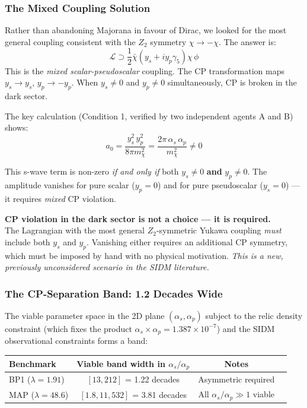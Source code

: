 \documentclass[12pt, a4paper]{article}
\begin{document}
\subsubsection{The Mixed Coupling Solution}

Rather than abandoning Majorana in favour of Dirac, we looked for the most general coupling consistent with the $Z_2$ symmetry $\chi \to -\chi$. The answer is:
\begin{equation}
  \mathcal{L} \supset \frac{1}{2}\bar\chi\left(y_s + iy_p\gamma_5\right)\chi\,\phi
\end{equation}
This is the \emph{mixed scalar-pseudoscalar} coupling. The CP transformation maps $y_s \to y_s$, $y_p \to -y_p$. When $y_s \neq 0$ and $y_p \neq 0$ simultaneously, CP is broken in the dark sector.

The key calculation (Condition 1, verified by two independent agents A and B) shows:
\begin{equation}
  a_0 = \frac{y_s^2\,y_p^2}{8\pi m_\chi^2} = \frac{2\pi\,\alpha_s\,\alpha_p}{m_\chi^2} \neq 0
\end{equation}

This s-wave term is non-zero \emph{if and only if} both $y_s \neq 0$ \textbf{and} $y_p \neq 0$. The amplitude vanishes for pure scalar ($y_p = 0$) and for pure pseudoscalar ($y_s = 0$) --- it requires \emph{mixed} CP violation.

\begin{insightbox}
\textbf{CP violation in the dark sector is not a choice --- it is required.}\\
The Lagrangian with the most general $Z_2$-symmetric Yukawa coupling \emph{must} include both $y_s$ and $y_p$.
Vanishing either requires an additional CP symmetry, which must be imposed by hand with no physical motivation.
\emph{This is a new, previously unconsidered scenario in the SIDM literature.}
\end{insightbox}

\subsubsection{The CP-Separation Band: 1.2 Decades Wide}

The viable parameter space in the 2D plane $(\alpha_s, \alpha_p)$ subject to the relic density constraint (which fixes the product $\alpha_s \times \alpha_p = 1.387 \times 10^{-7}$) and the SIDM observational constraints forms a band:

\begin{center}
\begin{tabular}{lccc}
  \toprule
  Benchmark & Viable band width in $\alpha_s/\alpha_p$ & Notes \\
  \midrule
  BP1 ($\lambda = 1.91$) & $[13, 212]$ = 1.22 decades & Asymmetric required \\
  MAP ($\lambda = 48.6$) & $[1.8, 11{,}532]$ = 3.81 decades & All $\alpha_s/\alpha_p \gg 1$ viable \\
  \bottomrule
\end{tabular}
\end{center}
\end{document}
